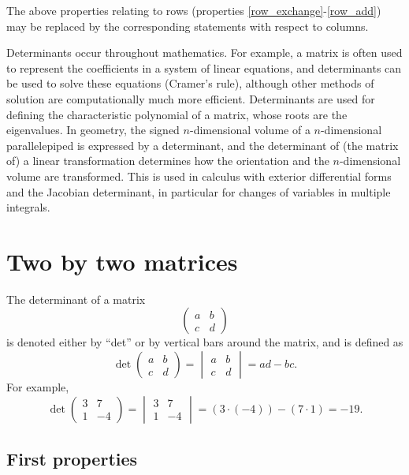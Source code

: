 The above properties relating to rows (properties
\ref{row_exchange}-\ref{row_add}) may be replaced by the
corresponding statements with respect to columns.

Determinants occur throughout mathematics. For example, a matrix is
often used to represent the coefficients in a system of linear
equations, and determinants can be used to solve these equations
(Cramer's rule), although other methods of solution are
computationally much more efficient.  Determinants are used for
defining the characteristic polynomial of a matrix, whose roots are
the eigenvalues. In geometry, the signed $n$-dimensional volume of a
$n$-dimensional parallelepiped is expressed by a determinant, and the
determinant of (the matrix of) a linear transformation determines how
the orientation and the $n$-dimensional volume are transformed. This is
used in calculus with exterior differential forms and the Jacobian
determinant, in particular for changes of variables in multiple
integrals.

\section{Two by two matrices}

The determinant of a matrix
\begin{equation}
  \begin{pmatrix} a & b \\c & d \end{pmatrix}
  \label{eq:2by2}
\end{equation}
  is denoted either by ``det''
or by vertical bars around the matrix, and is defined as
$$\det \begin{pmatrix} a & b \\c & d \end{pmatrix} = \begin{vmatrix} a & b \\c & d \end{vmatrix} = ad - bc.$$
For example,
$$\det \begin{pmatrix} 3 & 7 \\1 & -4 \end{pmatrix} = \begin{vmatrix} 3 & 7 \\ 1 & {-4} \end{vmatrix} = (3 \cdot (-4)) - (7 \cdot 1) = -19.$$

\subsection{First properties}

